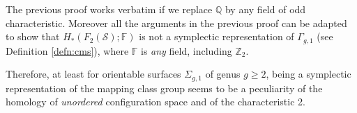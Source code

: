 \documentclass{amsart}
\theoremstyle{plain}
\theoremstyle{definition}
\newcommand{\Q}{\mathbb{Q}}
\renewcommand{\S}{\mathcal{S}}
\newcommand{\Z}{\mathbb{Z}}
\newcommand{\sg}{\Sigma_{g,1}}
\renewcommand{\gg}{\Gamma_{g,1}}
\begin{document}
The previous proof works verbatim if we replace $\Q$ by any field of odd characteristic. Moreover
all the arguments in the previous proof can be adapted to show that $H_*(F_2(\S);\mathbb{F})$ is
not a symplectic representation of $\gg$ (see Definition \ref{defn:cms}), where
$\mathbb{F}$ is \emph{any} field, including $\Z_2$.

Therefore, at least for orientable surfaces $\sg$ of genus $g\geq 2$,
being a symplectic representation of the mapping class group seems to be a peculiarity
of the homology of \emph{unordered} configuration space and of the characteristic 2.

{}

\end{document}
